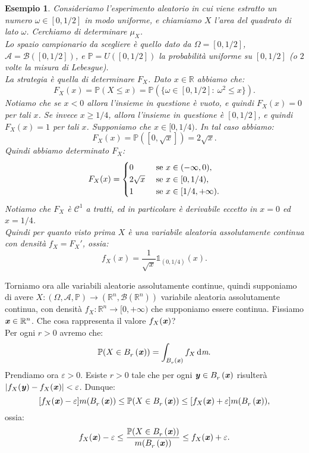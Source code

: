 \documentclass[11pt]{book}
\theoremstyle{Definizione}
\theoremstyle{TeoremaProposizioneLemmaCorollario}
\theoremstyle{OsservazioneNota}
\newtheorem{myes}{Esempio}[section]
\newcommand{\R}{\mathbb{R}}
\newcommand{\Ball}[3][]{B^{#1}_{{#2}}\left({#3}\right)}
\newcommand{\gri}[1]{\textbf{\textit{{#1}}}}
\renewcommand{\P}{\mathbb{P}}
\renewcommand{\d}{\mathrm{d}}
\newcommand{\dm}{\,\d \textit{m}}
\newcommand{\uno}[1]{\mathds{1}_{#1}}
\begin{document}
\begin{myes}
Consideriamo l'esperimento aleatorio in cui viene estratto un numero $\omega\in [0,1/2]$ in modo uniforme, e chiamiamo $X$ l'area del quadrato di lato $\omega$. Cerchiamo di determinare $\mu_X$.\\
Lo spazio campionario da scegliere è quello dato da $\Omega = [0,1/2]$, $\mathcal{A} = \mathcal{B}([0,1/2])$, e $\P = U([0,1/2])$ la probabilità uniforme su $[0,1/2]$ (o $2$ volte la misura di Lebesgue).\\
La strategia è quella di determinare $F_X$. Dato $x\in \R$ abbiamo che:
$$
F_X(x) = \P(X\leq x) = \P(\{\omega\in [0,1/2]:\ \omega^2 \leq x\}).
$$
Notiamo che se $x < 0$ allora l'insieme in questione è vuoto, e quindi $F_X(x) = 0$ per tali $x$. Se invece $x \geq 1/4$, allora l'insieme in questione è $[0,1/2]$, e quindi $F_X(x) = 1$ per tali $x$. Supponiamo che $x\in [0,1/4)$. In tal caso abbiamo:
$$
F_X(x) = \P([0,\sqrt{x}]) = 2\sqrt{x}.
$$
Quindi abbiamo determinato $F_X$:
$$
F_X(x) = \begin{cases}
0 &\textup{ se } x \in (-\infty,0),\\
2\sqrt{x}&\textup{ se }x\in [0,1/4),\\
1 &\textup{ se }x\in [1/4,+\infty).
\end{cases}
$$
Notiamo che $F_X$ è $\mathcal{C}^1$ a tratti, ed in particolare è derivabile eccetto in $ x = 0$ ed $x = 1/4$.\\
Quindi per quanto visto prima $X$ è una variabile aleatoria assolutamente continua con densità $f_X = F_X'$, ossia:
$$
f_X(x) = \frac{1}{\sqrt{x}}\uno{(0,1/4)}(x).
$$
\end{myes}
Torniamo ora alle variabili aleatorie assolutamente continue, quindi supponiamo di avere $X:(\Omega,\mathcal{A},\P) \longrightarrow (\R^n,\mathcal{B}(\R^n))$ variabile aleatoria assolutamente continua, con densità $f_X:\R^n \longrightarrow [0,+\infty)$ che supponiamo essere continua. Fissiamo $\gri{x}\in \R^n$. Che cosa rappresenta il valore $f_X(\gri{x})$?\\
Per ogni $r > 0$ avremo che:
$$
\P(X\in \Ball{r}{\gri{x}}) = \int_{\Ball{r}{\gri{x}}} f_X \dm.
$$
Prendiamo ora $\varepsilon >0$. Esiste $r > 0$ tale che per ogni $\gri{y}\in \Ball{r}{\gri{x}}$ risulterà $|f_X(\gri{y})-f_X(\gri{x})| < \varepsilon$. Dunque:
$$
[f_X(\gri{x})-\varepsilon]m(\Ball{r}{\gri{x}}) \leq \P(X\in \Ball{r}{\gri{x}}) \leq [f_X(\gri{x})+\varepsilon]m(\Ball{r}{\gri{x}}),
$$
ossia:
$$
f_X(\gri{x}) -\varepsilon \leq \frac{\P(X\in \Ball{r}{\gri{x}})}{m(\Ball{r}{\gri{x}})} \leq f_X(\gri{x}) +\varepsilon.
$$
\end{document}
